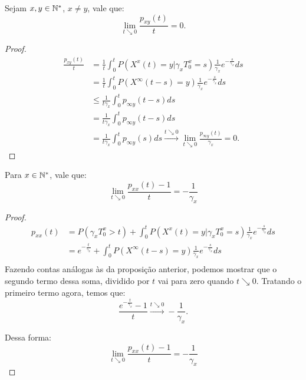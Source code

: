 \begin{proposicao}
  \label{prop:taxa-x-y}
  Sejam $x, y \in {\mathbb{N^*}}$, $x \neq y$, vale que:
  \begin{displaymath}
    \lim_{t \searrow 0} \frac{p_{xy}(t)}{t} = 0.
  \end{displaymath}
\end{proposicao}
\begin{proof}
  \begin{align*}
    \frac{p_{x y} (t)}{t}
    &= \frac{1}{t}\int_{0}^{t} P( X^x(t) = y |
    \gamma_x T_0^x = s) \frac{1}{\gamma_x} e^{-\frac{s}{\gamma_x}} ds\\
    &= \frac{1}{t} \int_{0}^{t} P( X^\infty(t-s) = y ) \frac{1}{\gamma_x}
    e^{-\frac{s}{\gamma_x}} ds \\
    &\leq \frac{1}{t \gamma_x} \int_{0}^{t} p_{\infty y}(t-s) ds \\
    &= \frac{1}{t \gamma_x} \int_{0}^{t} p_{\infty y}(t-s) ds \\
    &= \frac{1}{t \gamma_x} \int_{0}^{t} p_{\infty y}(s) ds
    \xrightarrow{t \searrow 0} \lim_{t \searrow 0} \frac{p_{\infty y}
      (t)}{\gamma_x} = 0.
  \end{align*}

\end{proof}

\begin{proposicao}
  \label{prop:taxa-x-x}
  Para $x \in {\mathbb{N^*}}$, vale que:
  \begin{displaymath}
    \lim_{t \searrow 0} \frac{p_{xx}(t) - 1}{t} = -\frac{1}{\gamma_x}
  \end{displaymath}
\end{proposicao}
\begin{proof}
  \begin{align*}
    p_{xx} (t)
    &= P( \gamma_x T_0^x > t) + 
    \int_{0}^{t} P( X^x(t) = y |
    \gamma_x T_0^x = s) \frac{1}{\gamma_x} e^{-\frac{s}{\gamma_x}} ds\\
    &= e^{-\frac{t}{\gamma_x}} + 
    \int_{0}^{t} P( X^\infty(t-s) = y) \frac{1}{\gamma_x} e^{-\frac{s}{\gamma_x}} ds\\
  \end{align*}
  Fazendo contas análogas às da proposição anterior, podemos
  mostrar que o segundo termo dessa soma, dividido por $t$ vai para
  zero quando $t \searrow 0$. Tratando o primeiro termo agora, temos
  que:
  \begin{displaymath}
    \frac{e^{-\frac{t}{\gamma_x}} - 1}{t} \xrightarrow{t \searrow 0}
    -\frac{1}{\gamma_x}.
  \end{displaymath}

  Dessa forma:
  \begin{displaymath}
     \lim_{t \searrow 0} \frac{p_{xx} (t) - 1}{t} = -\frac{1}{\gamma_x}
  \end{displaymath}
  
\end{proof}

